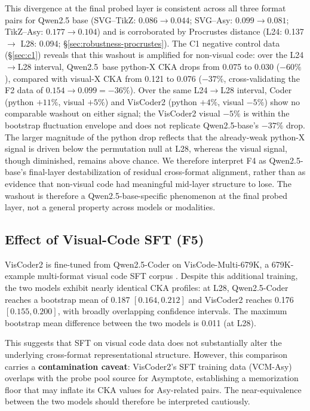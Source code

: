 This divergence at the final probed layer is consistent across all three format pairs for Qwen2.5 base (SVG--TikZ: $0.086 \to 0.044$; SVG--Asy: $0.099 \to 0.081$; TikZ--Asy: $0.177 \to 0.104$) and is corroborated by Procrustes distance (L24: 0.137 $\to$ L28: 0.094; \S\ref{sec:robustness-procrustes}).
The C1 negative control data (\S\ref{sec:c1}) reveals that this washout is amplified for non-visual code: over the L24$\to$L28 interval, Qwen2.5~base python-X CKA drops from 0.075 to 0.030 ($-60\%$), compared with visual-X CKA from 0.121 to 0.076 ($-37\%$, cross-validating the F2 data of $0.154 \to 0.099 = -36\%$).
Over the same L24$\to$L28 interval, Coder (python $+11\%$, visual $+5\%$) and VisCoder2 (python $+4\%$, visual $-5\%$) show no comparable washout on either signal; the VisCoder2 visual $-5\%$ is within the bootstrap fluctuation envelope and does not replicate Qwen2.5-base's $-37\%$ drop.
The larger magnitude of the python drop reflects that the already-weak python-X signal is driven below the permutation null at L28, whereas the visual signal, though diminished, remains above chance.
We therefore interpret F4 as Qwen2.5-base's final-layer destabilization of residual cross-format alignment, rather than as evidence that non-visual code had meaningful mid-layer structure to lose.
The washout is therefore a Qwen2.5-base-specific phenomenon at the final probed layer, not a general property across models or modalities.

\subsection{Effect of Visual-Code SFT (F5)}
\label{sec:f5}

VisCoder2 is fine-tuned from Qwen2.5-Coder on VisCode-Multi-679K, a 679K-example multi-format visual code SFT corpus \cite{viscoder2}.
Despite this additional training, the two models exhibit nearly identical CKA profiles: at L28, Qwen2.5-Coder reaches a bootstrap mean of 0.187 $[0.164, 0.212]$ and VisCoder2 reaches 0.176 $[0.155, 0.200]$, with broadly overlapping confidence intervals.
The maximum bootstrap mean difference between the two models is 0.011 (at L28).

This suggests that SFT on visual code data does not substantially alter the underlying cross-format representational structure.
However, this comparison carries a \textbf{contamination caveat}: VisCoder2's SFT training data (VCM-Asy) overlaps with the probe pool source for Asymptote, establishing a memorization floor that may inflate its CKA values for Asy-related pairs.
The near-equivalence between the two models should therefore be interpreted cautiously.

